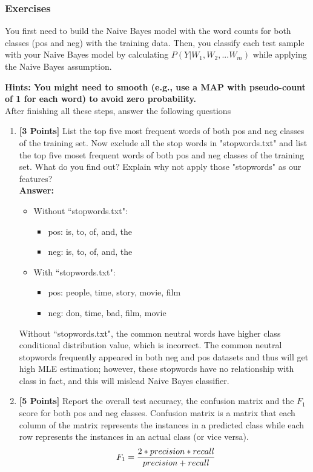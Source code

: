 \documentclass{article}
\begin{document}
\subsubsection*{Exercises}
You first need to build the Naive Bayes model with the word counts for both classes (pos and neg) with the training data. Then, you classify each test sample with your Naive Bayes model by calculating  $P(Y | W_1, W_2, ...W_m)$ while applying the Naive Bayes assumption.

 \textbf{Hints: You might need to smooth (e.g., use a MAP with pseudo-count of 1 for each word) to avoid zero probability. }
\\ After finishing all these steps, answer the following questions

\begin{enumerate}
	\item \textbf{[3 Points]} List the top five most frequent words of both pos and neg classes of the training set. Now exclude all the stop words in "stopwords.txt" and list the top five moset frequent words of both pos and neg classes of the training set. What do you find out? Explain why not apply those "stopwords" as our features?\\
	\textbf{Answer:}\\
	\begin{itemize}
		\item Without ``stopwords.txt":
		\begin{itemize}
			\item pos: is, to, of, and, the
			\item neg: is, to, of, and, the
		\end{itemize}
		\item With ``stopwords.txt":
		\begin{itemize}
			\item pos: people, time, story, movie, film
			\item neg: don, time, bad, film, movie
		\end{itemize}
	\end{itemize} 
	Without ``stopwords.txt", the common neutral words have higher class conditional distribution value, which is incorrect. The common neutral stopwords frequently appeared in both neg and pos datasets and thus will get high MLE estimation; however, these stopwords have no relationship with class in fact, and this will mislead Naive Bayes classifier. 
	
 	\item \textbf{[5 Points]} Report the overall test accuracy, the confusion matrix and the $F_1$ score for both pos and neg classes. Confusion matrix is a matrix that each column of the matrix represents the instances in a predicted class while each row represents the instances in an actual class (or vice versa).   
	\begin{equation}\label{eqn:f1score}
	\ F_1 =  {2*precision*recall\over precision + recall}
	\end{equation}
	

\end{enumerate}
\end{document}
